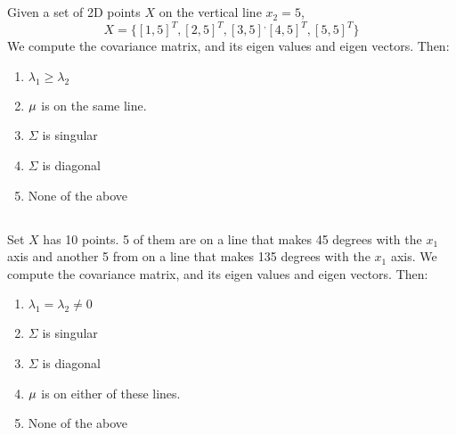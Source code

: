 \begin{frame}
\section{}
  Given a set of 2D points $X$ on the vertical line $x_2=5$,
   \[ X = \{ [1,5]^T, [2,5]^T, [3,5]^, [4,5]^T, [5,5]^T \}\]
  We compute the covariance matrix, and its eigen values and eigen vectors. Then:
    \begin{enumerate}[label=(\Alph*)]
       \item $\lambda_1 \geq \lambda_2$   %
       \item ${\bf \mu}$ is on the same line.   %
       \item  $\Sigma$ is singular    %
       \item  $\Sigma$ is diagonal    %
       \item None of the above    %
    \end{enumerate}
\end{frame}

\begin{frame}
\section{}
  Set $X$ has 10 points. 5 of them are on a line that makes 45 degrees with the $x_1$ axis and another 5 from on a line that makes 135 degrees with the $x_1$ axis.
  We compute the covariance matrix, and its eigen values and eigen vectors. Then:
     \begin{enumerate}[label=(\Alph*)]
      \item $\lambda_1 = \lambda_2 \neq 0$
      \item $\Sigma$ is singular
      \item $\Sigma$ is diagonal
      \item ${\bf \mu}$ is on either of these lines.
      \item None of the above   %
     \end{enumerate}
\end{frame}
